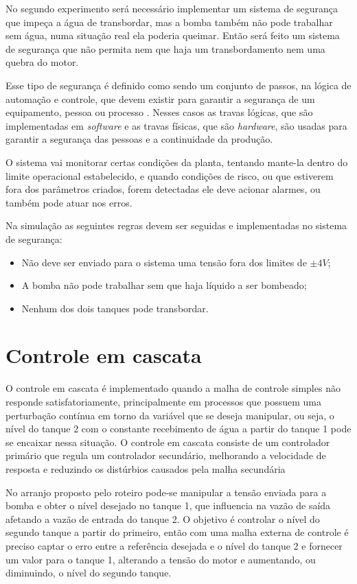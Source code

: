 \documentclass[
	12pt,				%
	openany,			%
	oneside,			%
	a4paper,			%
	english,			%
	french,				%
	spanish,			%
	brazil,				%
	]{abntex2}
\begin{document}
{No segundo experimento será necessário implementar um sistema de segurança que impeça a água de transbordar, mas a bomba também não pode trabalhar sem água, numa situação real ela poderia queimar. Então será feito um sistema de segurança que não permita nem que haja um transbordamento nem uma quebra do motor. 

Esse tipo de segurança é definido como sendo um conjunto de passos, na lógica de automação e controle, que devem existir para garantir a segurança de um equipamento, pessoa ou processo \cite{meneghetti1}. Nesses casos as travas lógicas, que são implementadas em \textit{software} e as travas físicas, que são \textit{hardware}, são usadas para garantir a segurança das pessoas e a continuidade da produção.

O sistema vai monitorar certas condições da planta, tentando mante-la dentro do limite operacional estabelecido, e quando condições de risco, ou que estiverem fora dos parâmetros criados, forem detectadas ele deve acionar alarmes, ou também pode atuar nos erros.

Na simulação as seguintes regras devem ser seguidas e implementadas no sistema de segurança:

\begin{itemize}
	\item Não deve ser enviado para o sistema uma tensão fora dos limites de $\pm 4V$;
	\item A bomba não pode trabalhar sem que haja líquido a ser bombeado;
	\item Nenhum dos dois tanques pode transbordar.
\end{itemize}

\section{Controle em cascata}

O controle em cascata é implementado quando a malha de controle simples não responde satisfatoriamente, principalmente em processos que possuem uma perturbação contínua em torno da variável que se deseja manipular, ou seja, o nível do tanque 2 com o constante recebimento de água a partir do tanque 1 pode se encaixar nessa situação. O controle em cascata consiste de um controlador primário que regula um controlador secundário, melhorando a velocidade de resposta e reduzindo os distúrbios causados pela malha secundária

No arranjo proposto pelo roteiro pode-se manipular a tensão enviada para a bomba e obter o nível desejado no tanque 1, que influencia na vazão de saída afetando a vazão de entrada do tanque 2. O objetivo é controlar o nível do segundo tanque a partir do primeiro, então com uma malha externa de controle é preciso captar o erro entre a referência desejada e o nível do tanque 2 e fornecer um valor para o tanque 1, alterando a tensão do motor e aumentando, ou diminuindo, o nível do segundo tanque.
}
\end{document}
